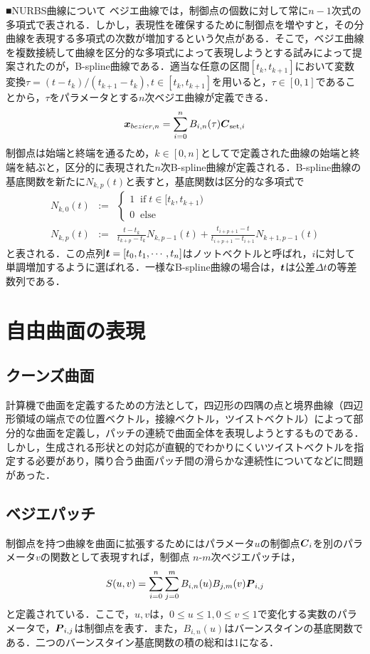 		■NURBS曲線について
		ベジエ曲線では，制御点の個数に対して常に$ n-1 $次式の多項式で表される．しかし，表現性を確保するために制御点を増やすと，その分曲線を表現する多項式の次数が増加するという欠点がある．そこで，ベジエ曲線を複数接続して曲線を区分的な多項式によって表現しようとする試みによって提案されたのが，B-spline曲線である．適当な任意の区間$[t_k,t_{k+1}] $において変数変換$ \tau = (t-t_k)/(t_{k+1}-t_k), t\in[t_k,t_{k+1}] $を用いると，$ \tau \in [0,1] $であることから，$ \tau $をパラメータとする$ n $次ベジエ曲線が定義できる．
		\begin{equation}\label{eq:Segmented_Bezier}
			\boldsymbol{x}_{bezier,n} = \sum_{i=0}^{n} B_{i,n}(\tau)\boldsymbol{C}_{\mathrm{set},i}
		\end{equation}
		制御点は始端と終端を通るため，$ k\in[0,n] $としてで定義された曲線の始端と終端を結ぶと，区分的に表現された$ n $次B-spline曲線が定義される．B-spline曲線の基底関数を新たに$ N_{k,p}(t) $と表すと，基底関数は区分的な多項式で
		\begin{eqnarray}\label{eq:de_door_cox}
			N_{k,0}(t) &:=& \begin{cases} 
			1 \;\; \mathrm{if}\; t\in[t_k,t_{k+1}) \\
			0 \;\; \mathrm{else}
		\end{cases} \\
		N_{k,p}(t) &:=& \frac{t-t_k}{t_{k+p} - t_k} N_{k,p-1}(t) + \frac{t_{i+p+1}-t}{t_{i+p+1}-t_{i+1}} N_{k+1,p-1}(t)
		\end{eqnarray}
		と表される．この点列$ \boldsymbol{t} = [t_0,t_1,\cdots, t_n] $はノットベクトルと呼ばれ，$ i $に対して単調増加するように選ばれる．一様なB-spline曲線の場合は，$ \boldsymbol{t} $は公差$ \Delta t $の等差数列である．
\section{自由曲面の表現}
	\subsection{クーンズ曲面}
		計算機で曲面を定義するための方法として，四辺形の四隅の点と境界曲線（四辺形領域の端点での位置ベクトル，接線ベクトル，ツイストベクトル）によって部分的な曲面を定義し，パッチの連続で曲面全体を表現しようとするものである．しかし，生成される形状との対応が直観的でわかりにくいツイストベクトルを指定する必要があり，隣り合う曲面パッチ間の滑らかな連続性についてなどに問題があった．
	\subsection{ベジエパッチ}
		制御点を持つ曲線を曲面に拡張するためにはパラメータ$ u $の制御点$ \boldsymbol{C}_i $を別のパラメータ$ v $の関数として表現すれば，制御点
		$ n $-$ m $次ベジエパッチは，
			\begin{equation}\label{eq:BezierPatch}
				S(u,v) = \sum_{i=0}^{n} \sum_{j=0}^{m} B_{i,n}(u) B_{j,m}(v) \boldsymbol{P}_{i,j}
			\end{equation}
		と定義されている．ここで，$ u,v $は，$ 0\leq u \leq 1 , 0 \leq v \leq 1$で変化する実数のパラメータで，$ \boldsymbol{P}_{i,j} $は制御点を表す．また，$ B_{i,n}(u) $はバーンスタインの基底関数である．二つのバーンスタイン基底関数の積の総和は1になる．
		
